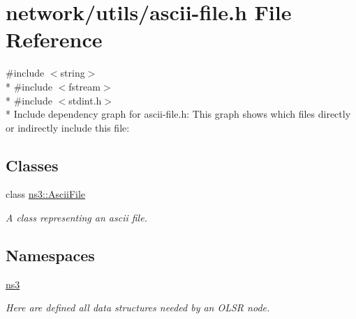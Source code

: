 \hypertarget{ascii-file_8h}{}\section{network/utils/ascii-\/file.h File Reference}
\label{ascii-file_8h}
{\ttfamily \#include $<$string$>$}\\*
{\ttfamily \#include $<$fstream$>$}\\*
{\ttfamily \#include $<$stdint.\+h$>$}\\*
Include dependency graph for ascii-\/file.h\+:
This graph shows which files directly or indirectly include this file\+:
\subsection*{Classes}
\begin{DoxyCompactItemize}
\item 
class \hyperlink{classns3_1_1AsciiFile}{ns3\+::\+Ascii\+File}
\begin{DoxyCompactList}\small\item\em A class representing an ascii file. \end{DoxyCompactList}\end{DoxyCompactItemize}
\subsection*{Namespaces}
\begin{DoxyCompactItemize}
\item 
 \hyperlink{namespacens3}{ns3}
\begin{DoxyCompactList}\small\item\em Here are defined all data structures needed by an O\+L\+SR node. \end{DoxyCompactList}\end{DoxyCompactItemize}
